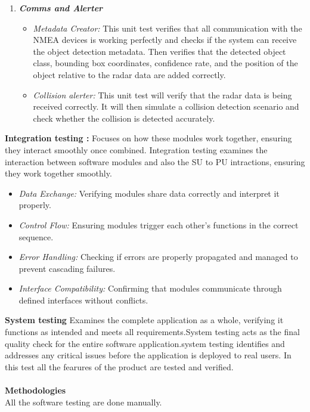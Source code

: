 \documentclass[a4paper,12pt]{article}
\begin{document}
\begin{enumerate}
\begin{itemize}
			
		\end{itemize}
		
		
		\item \textbf{\textit{Comms and Alerter}}
		\begin{itemize}
			\item \textit{Metadata Creator:}
			This unit test verifies that all communication with the NMEA devices is working perfectly and checks if the system can receive the object detection metadata. Then verifies that the detected object class, bounding box coordinates, confidence rate, and the position of the object relative to the radar data are added correctly.
			
			\item \textit{Collision alerter:}
			This unit test will verify that the radar data is being received correctly. It will then simulate a collision detection scenario and check whether the collision is detected accurately.
			
			
			
		\end{itemize}
		
	\end{enumerate}
	
	\noindent
	\textbf{Integration testing :}
	\newline
	Focuses on how these modules work together, ensuring they interact smoothly once combined. Integration testing examines the interaction between software modules and also the SU to PU intractions, ensuring they work together smoothly.
	\begin{itemize}
		\item \textit{Data Exchange: }
		Verifying modules share data correctly and interpret it properly.
		\item \textit{Control Flow:}
		Ensuring modules trigger each other’s functions in the correct sequence.
		\item \textit{Error Handling: }
		Checking if errors are properly propagated and managed to prevent cascading failures.
		\item \textit{Interface Compatibility: }
		Confirming that modules communicate through defined interfaces without conflicts.
	\end{itemize}
	
	\noindent
	\textbf{System testing}
	\newline
	Examines the complete application as a whole, verifying it functions as intended and meets all requirements.System testing acts as the final quality check for the entire software application.system testing identifies and addresses any critical issues before the application is deployed to real users. In this test all the fearures of the product are tested and verified.
	\\
	\noindent
	\\
	\textbf{Methodologies}
	\\
	All the software testing are done manually.
	\newline
	
\end{document}
